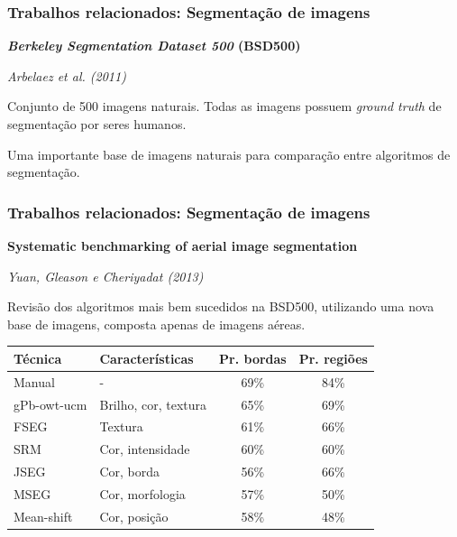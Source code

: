 \documentclass[t]{beamer}
\begin{document}
\begin{frame}[c]
	\frametitle{Trabalhos relacionados: Segmentação de imagens}

	\vspace{.5cm}

	\textbf{\textit{Berkeley Segmentation Dataset 500} (BSD500)}
	
	\textit{Arbelaez et al. (2011)}
	
	\vspace{.5cm}
		
	Conjunto de 500 imagens naturais. Todas as imagens possuem \textit{ground truth} de segmentação por seres humanos.
	
	\vspace{.5cm}
	
	Uma importante base de imagens naturais para comparação entre algoritmos de segmentação.

\end{frame}

\begin{frame}[c]
	\frametitle{Trabalhos relacionados: Segmentação de imagens}

	\vspace{.5cm}

	\textbf{Systematic benchmarking of aerial image segmentation}

	\textit{Yuan, Gleason e Cheriyadat (2013)}

	\vspace{.5cm}

	Revisão dos algoritmos mais bem sucedidos na BSD500, utilizando uma nova base de imagens, composta apenas de imagens aéreas.

	\small{
	\begin{table}[h]
	\centering
	\begin{tabulary}{\linewidth}{|L|L|C|C|}
	\hline
	\textbf{Técnica} & \textbf{Características} & \textbf{Pr. bordas} & \textbf{Pr. regiões } \\ \hline
	Manual      & \hspace{1cm} -       & 69\% & 84\% \\ \hline
	 gPb-owt-ucm &  Brilho, cor, textura &  65\% &  69\% \\ \hline
	FSEG        & Textura              & 61\% & 66\% \\ \hline
	SRM         & Cor, intensidade     & 60\% & 60\% \\ \hline
	JSEG        & Cor, borda           & 56\% & 66\% \\ \hline
	MSEG        & Cor, morfologia      & 57\% & 50\% \\ \hline
	Mean-shift  & Cor, posição         & 58\% & 48\% \\ \hline
	\end{tabulary}
	\end{table}
	}
\end{frame}
\end{document}
